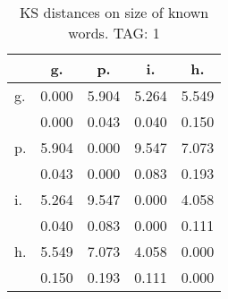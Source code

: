 \begin{table}[h!]
\begin{center}
\begin{tabular}{| l | c | c | c | c |}\hline
 & g. & p. & i. & h. \\\hline
g. & 0.000  & 5.904  & 5.264  & 5.549 \\\hline
 & 0.000  & 0.043  & 0.040  & 0.150 \\\hline
p. & 5.904  & 0.000  & 9.547  & 7.073 \\\hline
 & 0.043  & 0.000  & 0.083  & 0.193 \\\hline
i. & 5.264  & 9.547  & 0.000  & 4.058 \\\hline
 & 0.040  & 0.083  & 0.000  & 0.111 \\\hline
h. & 5.549  & 7.073  & 4.058  & 0.000 \\\hline
 & 0.150  & 0.193  & 0.111  & 0.000 \\\hline
\end{tabular}
\caption{KS distances on size of known words. TAG: 1}
\end{center}
\end{table}
